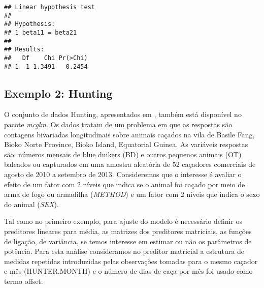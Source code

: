 \begin{knitrout}
\color{fgcolor}\begin{kframe}
\begin{alltt}
\hlstd{(} 
                      \hlstd{=} \hlstd{(}\hlstd{))}
\end{alltt}
\begin{verbatim}
## Linear hypothesis test
## 
## Hypothesis:                 
## 1 beta11 = beta21
## 
## Results:
##   Df    Chi Pr(>Chi)
## 1  1 1.3491   0.2454
\end{verbatim}
\end{kframe}
\end{knitrout}


\subsection{Exemplo 2: Hunting}

O conjunto de dados Hunting, apresentados em \citet{hunting}, também está disponível no pacote \emph{mcglm}. Os dados tratam de um problema em que as respostas são contagens bivariadas longitudinais sobre animais caçados na vila de Basile Fang, Bioko Norte Province, Bioko Island, Equatorial Guinea. As variáveis respostas são: números mensais de blue duikers (BD) e outros pequenos animais (OT) baleados ou capturados em uma amostra aleatória de 52 caçadores comerciais de agosto de 2010 a setembro de 2013. Consideremos que o interesse é avaliar o efeito de um fator com 2 níveis que indica se o animal foi caçado por meio de arma de fogo ou armadilha (\emph{METHOD}) e um fator com 2 níveis que indica o sexo do animal (\emph{SEX}).

\begin{knitrout}
\color{fgcolor}\begin{kframe}
\begin{alltt}
\hlstd{(}\hlstd{,}  \hlstd{=} \hlstd{)}
\end{alltt}
\end{kframe}
\end{knitrout}

Tal como no primeiro exemplo, para ajuste do modelo é necessário definir os preditores lineares para média, as matrizes dos preditores matriciais, as funções de ligação, de variância, se temos interesse em estimar ou não os parâmetros de potência. Para esta análise consideramos no preditor matricial a estrutura de medidas repetidas introduzidas pelas observações tomadas para o mesmo caçador e mês (HUNTER.MONTH) e o número de dias de caça por mês foi usado como termo offset.

